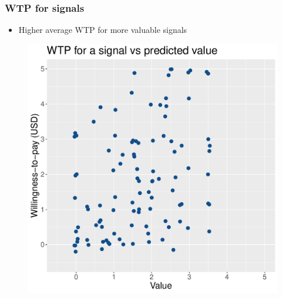 \documentclass[11pt,hyperref={bookmarks=false}]{beamer}
\begin{document}
\begin{frame}
\frametitle{WTP for signals}
\begin{itemize}
\item Higher average WTP for more valuable signals
\end{itemize}
\begin{figure}[h]
\includegraphics[scale=0.4]{Graphs/WTP_curve2.pdf}
\end{figure}
\end{frame}
\end{document}

